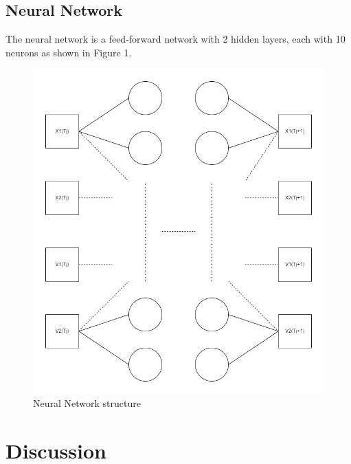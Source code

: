 \documentclass[12pt, a4paper]{article}
\begin{document}
\subsection{Neural Network}
The neural network is a feed-forward network with 2 hidden layers, each with 10 neurons as shown in Figure 1.
 \begin{figure}
    \centering
    \includegraphics[scale=0.5]{../NN_graph.png}
    \caption[]{Neural Network structure}
    \label{fig:neural_network}
 \end{figure}

\section{Discussion}
\end{document}
